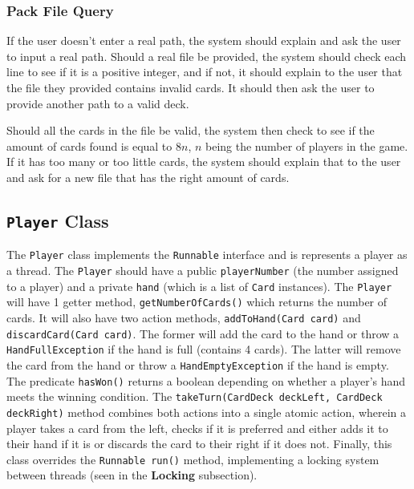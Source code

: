 \documentclass[a4paper, 11pt] {article}
\begin{document}
\subsubsection*{Pack File Query}
If the user doesn't enter a real path, the system should explain and ask the user to input a real path.
Should a real file be provided, the system should check each line to see if it is a positive integer, and if not, it should explain to the user that the file they provided contains invalid cards. It should then ask the user to provide another path to a valid deck.

Should all the cards in the file be valid, the system then check to see if the amount of cards found is equal to $8n$, $n$ being the number of players in the game. If it has too many or too little cards, the system should explain that to the user and ask for a new file that has the right amount of cards.
\subsection*{\texttt{Player} Class}
The \texttt{Player} class implements the \texttt{Runnable} interface and is represents a player as a thread. 
The \texttt{Player} should have a public \texttt{playerNumber} (the number assigned to a player) and a private \texttt{hand} (which is a list of \texttt{Card} instances). 
The \texttt{Player} will have 1 getter method, \texttt{getNumberOfCards()} which returns the number of cards. 
It will also have two action methods, \texttt{addToHand(Card card)} and \texttt{discardCard(Card card)}. The former will add the card to the hand or throw a \texttt{HandFullException} if the hand is full (contains 4 cards). The latter will remove the card from the hand or throw a \texttt{HandEmptyException} if the hand is empty. 
The predicate \texttt{hasWon()} returns a boolean depending on whether a player's hand meets the winning condition. 
The \texttt{takeTurn(CardDeck deckLeft, CardDeck deckRight)} method combines both actions into a single atomic action, wherein a player takes a card from the left, checks if it is preferred and either adds it to their hand if it is or discards the card to their right if it does not. 
Finally, this class overrides the \texttt{Runnable run()} method, implementing a locking system between threads (seen in the \textbf{Locking} subsection).
\end{document}
